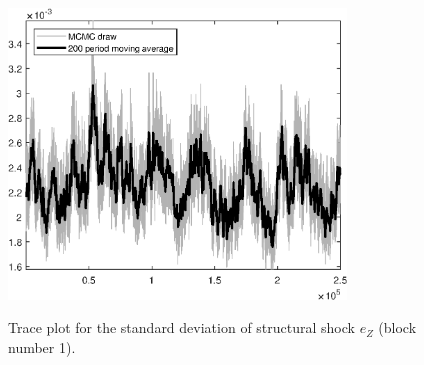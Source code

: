 \begin{figure}[H]
\centering
  \includegraphics[width=0.8\textwidth]{BRS_comovement/graphs/TracePlot_SE_e_Z_blck_1}\\
    \caption{Trace plot for the standard deviation of structural shock ${e_Z}$ (block number 1).}
\end{figure}
